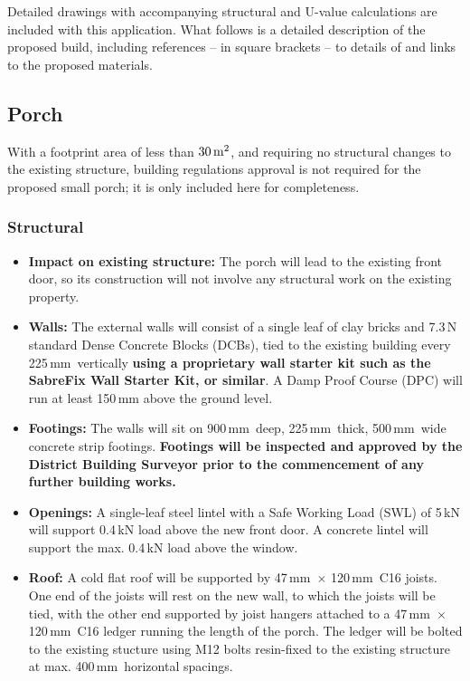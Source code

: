 \documentclass{extension}
\newcommand{\mm}{\,$\mathrm{mm}$}
\begin{document}
Detailed drawings with accompanying structural and U-value calculations are included with this application. What follows is a detailed description of the proposed build, including references -- in square brackets -- to details of and links to the proposed materials.

\subsection{Porch}
\label{porch}
With a footprint area of less than $30\,{\rm m^2}$, and requiring no structural changes to the existing structure, building regulations approval is not required for the proposed small porch; it is only included here for completeness.
\subsubsection{Structural}
\begin{itemize}
  \item {\bf Impact on existing structure:} The porch will lead to the existing front door, so its construction will not involve any structural work on the existing property.
  \item {\bf Walls:} The external walls will consist of a single leaf of clay bricks and 7.3\,N standard Dense Concrete Blocks (DCBs), tied to the existing building every 225\mm\ vertically {\bf using a proprietary wall starter kit such as the SabreFix Wall Starter Kit, or similar}.\cite{starterkit} A Damp Proof Course (DPC) will run at least 150\,mm above the ground level.
  \item{\bf Footings:} The walls will sit on 900\mm\ deep, 225\mm\ thick, 500\mm\ wide concrete strip footings. {\bf Footings will be inspected and approved by the District Building Surveyor prior to the commencement of any further building works.}
  \item {\bf Openings:} A single-leaf steel lintel with a Safe Working Load (SWL) of 5\,kN\cite{psteel} will support 0.4\,kN load above the new front door. A concrete lintel\cite{pconc} will support the max. 0.4\,kN load above the window.
  \item {\bf Roof:} A cold flat roof will be supported by 47\mm\ $\times$ 120\mm\ C16 joists. One end of the joists will rest on the new wall, to which the joists will be tied, with the other end supported by joist hangers attached to a 47\mm\ $\times$ 120\mm\ C16 ledger running the length of the porch. The ledger will be bolted to the existing stucture using M12 bolts resin-fixed to the existing structure at max. 400\mm\ horizontal spacings.
\end{itemize}
\end{document}
